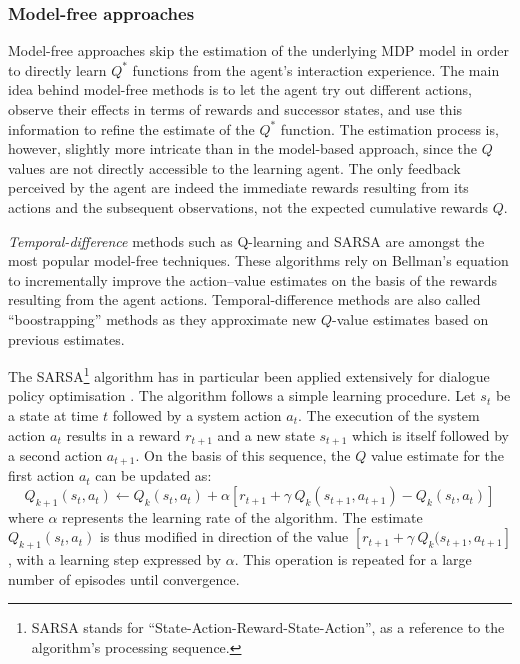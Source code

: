 \subsubsection{Model-free approaches}

Model-free approaches skip the estimation of the underlying MDP model in order to directly learn $Q^*$ functions from the agent's interaction experience.  The main idea behind model-free methods is to let the agent try out different actions, observe their effects in terms of rewards and successor states, and use this information to refine the estimate of the $Q^*$ function. The estimation process is, however, slightly more intricate than in the model-based approach, since the $Q$ values are not directly accessible to the learning agent.  The only feedback perceived by the agent are indeed the immediate rewards resulting from its actions and the subsequent observations, not the expected cumulative rewards $Q$.  

\textit{Temporal-difference} methods such as Q-learning \citep{watkins92} and SARSA \citep{rummery:phd95} are amongst the most popular model-free techniques. These algorithms rely on Bellman's equation to incrementally improve the action--value estimates on the basis of the rewards resulting from the agent actions. Temporal-difference methods are also called ``boostrapping'' methods as they approximate new $Q$-value estimates based on previous estimates. 

The SARSA\footnote{SARSA stands for ``State-Action-Reward-State-Action'', as a reference to the algorithm's processing sequence.} algorithm has in particular been applied extensively for dialogue policy optimisation \citep{RieserLemon11}.  The algorithm follows a simple learning procedure. Let $s_t$ be a state at time $t$ followed by a system action $a_t$. The execution of the system action $a_t$ results in a reward $r_{t+1}$ and a new state $s_{t+1}$ which is itself followed by a second action $a_{t+1}$.  On the basis of this sequence, the $Q$ value estimate for the first action $a_t$ can be updated as:
\begin{equation}
Q_{k+1}(s_t, a_t) \leftarrow Q_{k}(s_t,a_t) + \alpha \left[r_{t+1} + \gamma \ Q_{k}(s_{t+1}, a_{t+1}) - Q_{k}(s_t, a_t) \right] \label{eq:sarsa}
\end{equation}
where $\alpha$ represents the learning rate of the algorithm. The estimate $Q_{k+1}(s_t, a_t)$ is thus modified in direction of the value $ \left[r_{t+1} + \gamma \ Q_{k}(s_{t+1}, a_{t+1} \right]$, with a learning step expressed by $\alpha$. This operation is repeated for a large number of episodes until convergence.  

